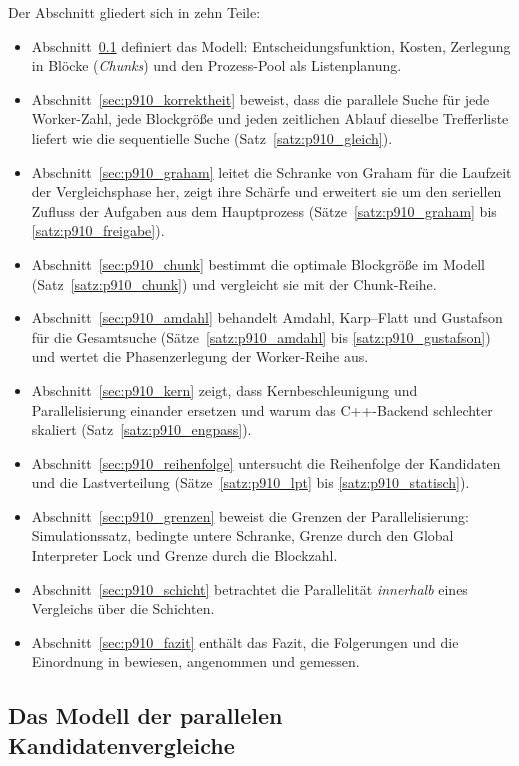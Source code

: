 \documentclass[a4paper,12pt, twoside]{report}
\theoremstyle{definition}
\begin{document}
Der Abschnitt gliedert sich in zehn Teile:
\begin{itemize}
\item Abschnitt~\ref{sec:p910_modell} definiert das Modell: Entscheidungsfunktion, Kosten, Zerlegung in Blöcke (\emph{Chunks}) und den Prozess-Pool als Listenplanung.
\item Abschnitt~\ref{sec:p910_korrektheit} beweist, dass die parallele Suche für jede Worker-Zahl, jede Blockgröße und jeden zeitlichen Ablauf dieselbe Trefferliste liefert wie die sequentielle Suche (Satz~\ref{satz:p910_gleich}).
\item Abschnitt~\ref{sec:p910_graham} leitet die Schranke von Graham für die Laufzeit der Vergleichsphase her, zeigt ihre Schärfe und erweitert sie um den seriellen Zufluss der Aufgaben aus dem Hauptprozess (Sätze~\ref{satz:p910_graham} bis \ref{satz:p910_freigabe}).
\item Abschnitt~\ref{sec:p910_chunk} bestimmt die optimale Blockgröße im Modell (Satz~\ref{satz:p910_chunk}) und vergleicht sie mit der Chunk-Reihe.
\item Abschnitt~\ref{sec:p910_amdahl} behandelt Amdahl, Karp--Flatt und Gustafson für die Gesamtsuche (Sätze~\ref{satz:p910_amdahl} bis \ref{satz:p910_gustafson}) und wertet die Phasenzerlegung der Worker-Reihe aus.
\item Abschnitt~\ref{sec:p910_kern} zeigt, dass Kernbeschleunigung und Parallelisierung einander ersetzen und warum das C++-Backend schlechter skaliert (Satz~\ref{satz:p910_engpass}).
\item Abschnitt~\ref{sec:p910_reihenfolge} untersucht die Reihenfolge der Kandidaten und die Lastverteilung (Sätze~\ref{satz:p910_lpt} bis \ref{satz:p910_statisch}).
\item Abschnitt~\ref{sec:p910_grenzen} beweist die Grenzen der Parallelisierung: Simulationssatz, bedingte untere Schranke, Grenze durch den Global Interpreter Lock und Grenze durch die Blockzahl.
\item Abschnitt~\ref{sec:p910_schicht} betrachtet die Parallelität \emph{innerhalb} eines Vergleichs über die Schichten.
\item Abschnitt~\ref{sec:p910_fazit} enthält das Fazit, die Folgerungen und die Einordnung in bewiesen, angenommen und gemessen.
\end{itemize}

\subsection{Das Modell der parallelen Kandidatenvergleiche}
\label{sec:p910_modell}
\end{document}
